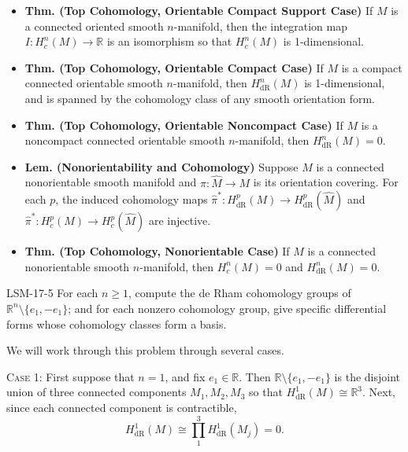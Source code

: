 \documentclass{article}
\begin{document}
	\begin{itemize}
		\item \textbf{Thm. (Top Cohomology, Orientable Compact Support Case)} If $M$ is a connected oriented smooth $n$-manifold, then the integration map $I: H^{n}_{c}(M) \to \mathbb{R}$ is an isomorphism so that $H^{n}_{c}(M)$ is 1-dimensional. 
		
		\item \textbf{Thm. (Top Cohomology, Orientable Compact Case)} If $M$ is a compact connected orientable smooth $n$-manifold, then $H^{n}_{\text{dR}}(M)$ is 1-dimensional, and is spanned by the cohomology class of any smooth orientation form. 
		
		\item \textbf{Thm. (Top Cohomology, Orientable Noncompact Case)} If $M$ is a noncompact connected orientable smooth $n$-manifold, then $H^{n}_{\text{dR}}(M) =0$. 
		
		\item \textbf{Lem. (Nonorientability and Cohomology)} Suppose $M$ is a connected nonorientable smooth manifold and $\hat{\pi}: \hat{M} \to M$ is its orientation covering. For each $p$, the induced cohomology maps $\hat{\pi}^{\ast}: H^{p}_{\text{dR}}(M) \to H^{p}_{\text{dR}}(\hat{M})$ and $\hat{\pi}^{\ast}: H^{p}_{c}(M) \to H^{p}_{c}(\hat{M})$ are injective. 
		
		\item \textbf{Thm. (Top Cohomology, Nonorientable Case)} If $M$ is a connected nonorientable smooth $n$-manifold, then $H^{n}_{c}(M) = 0$ and $H^{n}_{\text{dR}}(M) = 0$. 
	\end{itemize}
	\begin{prb}{LSM-17-5}
		For each $n \geq 1$, compute the de Rham cohomology groups of $\mathbb{R}^{n} \setminus \{e_{1}, -e_{1}\}$; and for each nonzero cohomology group, give specific differential forms whose cohomology classes form a basis. 
	\end{prb}
	We will work through this problem through several cases. 
	
	\textsc{Case 1:} First suppose that $n = 1$, and fix $e_{1} \in \mathbb{R}$. Then $\mathbb{R}\setminus \{e_{1},-e_{1}\}$ is the disjoint union of three connected components $M_{1}, M_{2}, M_{3}$ so that $H^{1}_{\text{dR}}(M) \cong \mathbb{R}^{3}$. Next, since each connected component is contractible, 
	\begin{equation*}
		H^{1}_{\text{dR}}(M) \cong \prod_{1}^{3}H^{1}_{\text{dR}}(M_{j}) = 0. 
	\end{equation*}
	
\end{document}
